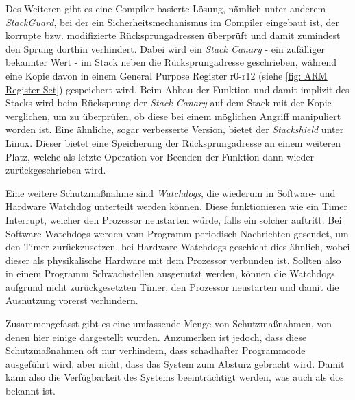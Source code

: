 \documentclass[a4paper,
DIV=13,
12pt,
BCOR=10mm,
department=FakIM,
oneside,
parskip=half,
automark,
listof=totocnumbered,
bibliography=totocnumbered,
acronym=totocnumbered
] {OTHRartcl}
\begin{document}
Des Weiteren gibt es eine Compiler basierte Lösung, nämlich unter anderem \textit{StackGuard}, bei der ein Sicherheitsmechanismus im Compiler eingebaut ist, der korrupte bzw. modifizierte Rücksprungadressen überprüft und damit zumindest den Sprung dorthin verhindert.
Dabei wird ein \textit{Stack Canary} - ein zufälliger bekannter Wert - im Stack neben die Rücksprungadresse geschrieben, während eine Kopie davon in einem General Purpose Register r0-r12 (siehe \autoref{fig: ARM Register Set})
gespeichert wird. Beim Abbau der Funktion und damit implizit des Stacks wird beim Rücksprung der \textit{Stack Canary} auf dem Stack mit der Kopie verglichen, um zu überprüfen, ob diese bei einem möglichen Angriff manipuliert worden ist.
Eine ähnliche, sogar verbesserte Version, bietet der \textit{Stackshield} unter Linux. Dieser bietet eine Speicherung der Rücksprungadresse an einem weiteren Platz, welche als letzte Operation vor Beenden der Funktion
dann wieder zurückgeschrieben wird. \cite{IEEE Xplore ROP} \cite{IEE buffer overflow stackguard}

Eine weitere Schutzmaßnahme sind \textit{Watchdogs}, die wiederum in Software- und Hardware Watchdog unterteilt werden können. Diese funktionieren wie ein Timer Interrupt, welcher den Prozessor neustarten würde,
falls ein solcher auftritt. Bei Software Watchdogs werden vom Programm periodisch Nachrichten gesendet, um den Timer zurückzusetzen, bei Hardware Watchdogs geschieht dies ähnlich, wobei dieser als physikalische Hardware
mit dem Prozessor verbunden ist. Sollten also in einem Programm Schwachstellen ausgenutzt werden, können die Watchdogs aufgrund nicht zurückgesetzten Timer, den Prozessor neustarten und damit die Ausnutzung vorerst verhindern. \cite{STM32 Watchdogs}

Zusammengefasst gibt es eine umfassende Menge von Schutzmaßnahmen, von denen hier einige dargestellt wurden. Anzumerken ist jedoch, dass diese Schutzmaßnahmen oft nur verhindern, dass schadhafter Programmcode
ausgeführt wird, aber nicht, dass das System zum Absturz gebracht wird. Damit kann also die Verfügbarkeit des Systems beeinträchtigt werden, was auch als \ac{dos} bekannt ist.
\end{document}
